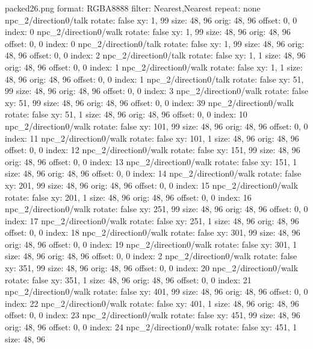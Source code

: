 packed26.png
format: RGBA8888
filter: Nearest,Nearest
repeat: none
npc_2/direction0/talk
  rotate: false
  xy: 1, 99
  size: 48, 96
  orig: 48, 96
  offset: 0, 0
  index: 0
npc_2/direction0/walk
  rotate: false
  xy: 1, 99
  size: 48, 96
  orig: 48, 96
  offset: 0, 0
  index: 0
npc_2/direction0/talk
  rotate: false
  xy: 1, 99
  size: 48, 96
  orig: 48, 96
  offset: 0, 0
  index: 2
npc_2/direction0/talk
  rotate: false
  xy: 1, 1
  size: 48, 96
  orig: 48, 96
  offset: 0, 0
  index: 1
npc_2/direction0/walk
  rotate: false
  xy: 1, 1
  size: 48, 96
  orig: 48, 96
  offset: 0, 0
  index: 1
npc_2/direction0/talk
  rotate: false
  xy: 51, 99
  size: 48, 96
  orig: 48, 96
  offset: 0, 0
  index: 3
npc_2/direction0/walk
  rotate: false
  xy: 51, 99
  size: 48, 96
  orig: 48, 96
  offset: 0, 0
  index: 39
npc_2/direction0/walk
  rotate: false
  xy: 51, 1
  size: 48, 96
  orig: 48, 96
  offset: 0, 0
  index: 10
npc_2/direction0/walk
  rotate: false
  xy: 101, 99
  size: 48, 96
  orig: 48, 96
  offset: 0, 0
  index: 11
npc_2/direction0/walk
  rotate: false
  xy: 101, 1
  size: 48, 96
  orig: 48, 96
  offset: 0, 0
  index: 12
npc_2/direction0/walk
  rotate: false
  xy: 151, 99
  size: 48, 96
  orig: 48, 96
  offset: 0, 0
  index: 13
npc_2/direction0/walk
  rotate: false
  xy: 151, 1
  size: 48, 96
  orig: 48, 96
  offset: 0, 0
  index: 14
npc_2/direction0/walk
  rotate: false
  xy: 201, 99
  size: 48, 96
  orig: 48, 96
  offset: 0, 0
  index: 15
npc_2/direction0/walk
  rotate: false
  xy: 201, 1
  size: 48, 96
  orig: 48, 96
  offset: 0, 0
  index: 16
npc_2/direction0/walk
  rotate: false
  xy: 251, 99
  size: 48, 96
  orig: 48, 96
  offset: 0, 0
  index: 17
npc_2/direction0/walk
  rotate: false
  xy: 251, 1
  size: 48, 96
  orig: 48, 96
  offset: 0, 0
  index: 18
npc_2/direction0/walk
  rotate: false
  xy: 301, 99
  size: 48, 96
  orig: 48, 96
  offset: 0, 0
  index: 19
npc_2/direction0/walk
  rotate: false
  xy: 301, 1
  size: 48, 96
  orig: 48, 96
  offset: 0, 0
  index: 2
npc_2/direction0/walk
  rotate: false
  xy: 351, 99
  size: 48, 96
  orig: 48, 96
  offset: 0, 0
  index: 20
npc_2/direction0/walk
  rotate: false
  xy: 351, 1
  size: 48, 96
  orig: 48, 96
  offset: 0, 0
  index: 21
npc_2/direction0/walk
  rotate: false
  xy: 401, 99
  size: 48, 96
  orig: 48, 96
  offset: 0, 0
  index: 22
npc_2/direction0/walk
  rotate: false
  xy: 401, 1
  size: 48, 96
  orig: 48, 96
  offset: 0, 0
  index: 23
npc_2/direction0/walk
  rotate: false
  xy: 451, 99
  size: 48, 96
  orig: 48, 96
  offset: 0, 0
  index: 24
npc_2/direction0/walk
  rotate: false
  xy: 451, 1
  size: 48, 96
